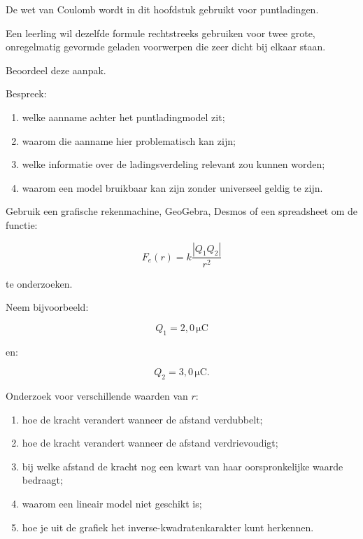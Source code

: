 \documentclass{ximera}
\begin{document}
\begin{oefening}[Modelkritiek]{\oefG}

De wet van Coulomb wordt in dit hoofdstuk gebruikt voor puntladingen.

Een leerling wil dezelfde formule rechtstreeks gebruiken voor twee
grote, onregelmatig gevormde geladen voorwerpen die zeer dicht bij
elkaar staan.

Beoordeel deze aanpak.

Bespreek:

\begin{enumerate}
  \item welke aanname achter het puntladingmodel zit;
  \item waarom die aanname hier problematisch kan zijn;
  \item welke informatie over de ladingsverdeling relevant zou kunnen
        worden;
  \item waarom een model bruikbaar kan zijn zonder universeel geldig te
        zijn.
\end{enumerate}

\end{oefening}




Gebruik een grafische rekenmachine, GeoGebra, Desmos of een
spreadsheet om de functie:

\[
F_e(r)
=
k\frac{|Q_1Q_2|}{r^2}
\]

te onderzoeken.

Neem bijvoorbeeld:

\[
Q_1=2{,}0\,\mathrm{\mu C}
\]

en:

\[
Q_2=3{,}0\,\mathrm{\mu C}.
\]

Onderzoek voor verschillende waarden van $r$:

\begin{enumerate}
  \item hoe de kracht verandert wanneer de afstand verdubbelt;
  \item hoe de kracht verandert wanneer de afstand verdrievoudigt;
  \item bij welke afstand de kracht nog een kwart van haar
        oorspronkelijke waarde bedraagt;
  \item waarom een lineair model niet geschikt is;
  \item hoe je uit de grafiek het inverse-kwadratenkarakter kunt
        herkennen.
\end{enumerate}
\end{document}
